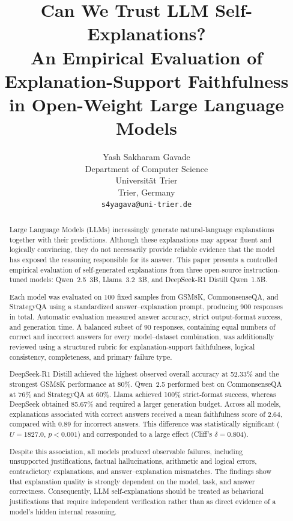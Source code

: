 \documentclass{article}
\title{
Can We Trust LLM Self-Explanations?\\
An Empirical Evaluation of Explanation-Support Faithfulness
in Open-Weight Large Language Models
}
\author{
Yash Sakharam Gavade\\
Department of Computer Science\\
Universit\"at Trier\\
Trier, Germany\\
\texttt{s4yagava@uni-trier.de}
}
\begin{document}
\maketitle

\begin{abstract}
Large Language Models (LLMs) increasingly generate natural-language
explanations together with their predictions. Although these
explanations may appear fluent and logically convincing, they do not
necessarily provide reliable evidence that the model has exposed the
reasoning responsible for its answer. This paper presents a controlled
empirical evaluation of self-generated explanations from three
open-source instruction-tuned models: Qwen~2.5~3B,
Llama~3.2~3B, and DeepSeek-R1 Distill Qwen~1.5B.

Each model was evaluated on 100 fixed samples from GSM8K,
CommonsenseQA, and StrategyQA using a standardized
answer--explanation prompt, producing 900 responses in total.
Automatic evaluation measured answer accuracy, strict output-format
success, and generation time. A balanced subset of 90 responses,
containing equal numbers of correct and incorrect answers for every
model--dataset combination, was additionally reviewed using a
structured rubric for explanation-support faithfulness, logical
consistency, completeness, and primary failure type.

DeepSeek-R1 Distill achieved the highest observed overall accuracy
at 52.33\% and the strongest GSM8K performance at 80\%.
Qwen~2.5 performed best on CommonsenseQA at 76\% and StrategyQA
at 60\%. Llama achieved 100\% strict-format success, whereas
DeepSeek obtained 85.67\% and required a larger generation budget.
Across all models, explanations associated with correct answers
received a mean faithfulness score of 2.64, compared with 0.89 for
incorrect answers. This difference was statistically significant
($U=1827.0$, $p<0.001$) and corresponded to a large effect
(Cliff's $\delta=0.804$).

Despite this association, all models produced observable failures,
including unsupported justifications, factual hallucinations,
arithmetic and logical errors, contradictory explanations, and
answer--explanation mismatches. The findings show that explanation
quality is strongly dependent on the model, task, and answer
correctness. Consequently, LLM self-explanations should be treated as
behavioral justifications that require independent verification rather
than as direct evidence of a model's hidden internal reasoning.
\end{abstract}
\end{document}
